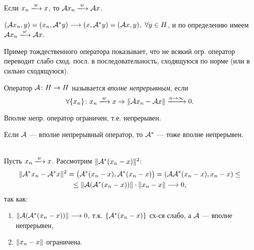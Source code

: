 \begin{lemma}
Если $x_n\xlongrightarrow{w}x$, то $\mcA x_n \xlongrightarrow{w} \mcA x$.
\end{lemma}
\begin{proofocre}
$({\mathcal{A}} x_n, y) = (x_n, {\mathcal{A}}^* y)\longrightarrow(x, {\mathcal{A}}^* y)=({\mathcal{A}} x, y),~\forall y\in H$, и по определению имеем $\mcA x_n\xlongrightarrow{w}\mcA x$.
\end{proofocre}

\begin{example}
Пример тождественного оператора показывает, что не всякий огр. оператор переводит слабо сход. посл. в последовательность, сходящуюся по норме (или в сильно сходящуюся).
\end{example}

\begin{definition}
Оператор ${\mathcal{A}}\colon H\to H$ называется \emph{вполне непрерывным}, если
$$\forall\{x_n\}\colon x_n\xlongrightarrow{w}x \Rightarrow \norm{\mcA x_n - \mcA x}\xrightarrow{n\to\infty}0.$$
\end{definition}

\begin{Commentwhite}
Вполне непр. оператор ограничен, т.е. непрерывен.
\end{Commentwhite}

\begin{theorem}
Если ${\mathcal{A}}$ --- вполне непрерывный оператор, то ${\mathcal{A}}^*$ --- тоже вполне непрерывен.
\end{theorem}
\begin{proofocre}
~\\
Пусть $x_n\xlongrightarrow{w}x$. Рассмотрим $\|{\mathcal{A}}^*(x_n - x)\|^2$:
\begin{multline*}
    \|{\mathcal{A}}^* x_n - {\mathcal{A}}^* x\|^2 = \big({\mathcal{A}}^* (x_n - x), {\mathcal{A}}^* (x_n - x)\big) = ({\mathcal{A}}{\mathcal{A}}^*(x_n - x), x_n - x)\le\\
    \le\|{\mathcal{A}}({\mathcal{A}}^*(x_n - x))\|\cdot\|x_n - x\|\longrightarrow0,
\end{multline*}
так как:
\begin{enumerate}
    \item $\|{\mathcal{A}}({\mathcal{A}}^*(x_n - x))\|\longrightarrow0$, т.к. $\{ {\mathcal{A}}^*(x_n - x) \}$ сх-ся слабо, а ${\mathcal{A}}$ --- вполне непрерывен,
    \item $\|x_n - x\|$ ограничена.
\end{enumerate}
\end{proofocre}



